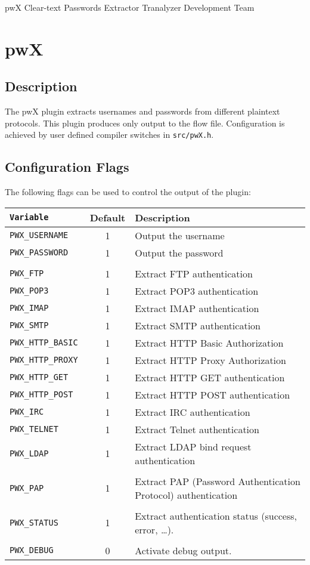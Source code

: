 \documentclass[documentation]{subfiles}
\begin{document}
\trantitle
    {pwX}
    {Clear-text Passwords Extractor}
    {Tranalyzer Development Team} %

\section{pwX}\label{s:pwX}

\subsection{Description}
The pwX plugin extracts usernames and passwords from different plaintext protocols.
This plugin produces only output to the flow file.
Configuration is achieved by user defined compiler switches in {\tt src/pwX.h}.

\subsection{Configuration Flags}
The following flags can be used to control the output of the plugin:
\begin{longtable}{>{\tt}lcl}
    \toprule
    {\bf Variable} & {\bf Default} & {\bf Description} \\
    \midrule\endhead%
    PWX\_USERNAME    & 1 & Output the username\\
    PWX\_PASSWORD    & 1 & Output the password\\
    \\
    PWX\_FTP         & 1 & Extract FTP authentication\\
    PWX\_POP3        & 1 & Extract POP3 authentication\\
    PWX\_IMAP        & 1 & Extract IMAP authentication\\
    PWX\_SMTP        & 1 & Extract SMTP authentication\\
    PWX\_HTTP\_BASIC & 1 & Extract HTTP Basic Authorization\\
    PWX\_HTTP\_PROXY & 1 & Extract HTTP Proxy Authorization\\
    PWX\_HTTP\_GET   & 1 & Extract HTTP GET authentication\\
    PWX\_HTTP\_POST  & 1 & Extract HTTP POST authentication\\
    PWX\_IRC         & 1 & Extract IRC authentication\\
    PWX\_TELNET      & 1 & Extract Telnet authentication\\
    PWX\_LDAP        & 1 & Extract LDAP bind request authentication\\\\
    PWX\_PAP         & 1 & Extract PAP (Password Authentication Protocol) authentication\\
    \\
    PWX\_STATUS      & 1 & Extract authentication status (success, error, \ldots).\\
    \\
    PWX\_DEBUG       & 0 & Activate debug output.\\
    \bottomrule
\end{longtable}
\end{document}
